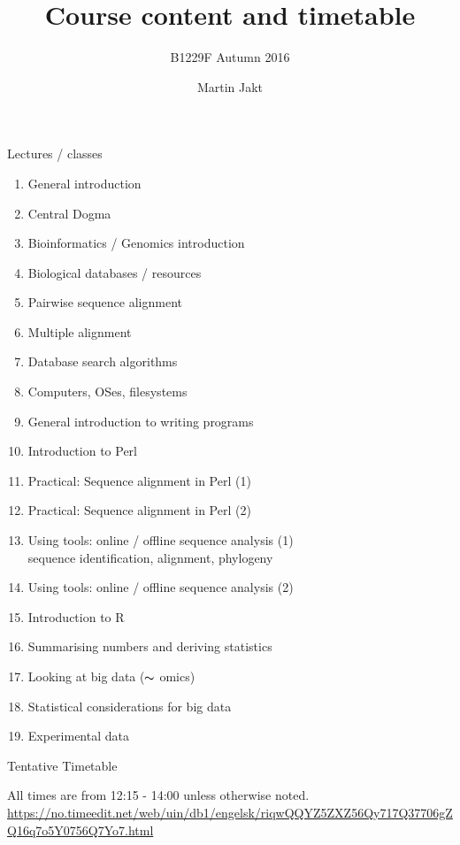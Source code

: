 \documentclass[pdf]{beamer}
\title{Course content and timetable}
\subtitle{B1229F Autumn 2016}
\author{Martin Jakt}
\begin{document}
\begin{frame}{Lectures / classes}
  \tiny
  \begin{enumerate}
  \item General introduction
  \item Central Dogma
  \item Bioinformatics / Genomics introduction
  \item Biological databases / resources
  \item Pairwise sequence alignment
  \item Multiple alignment
  \item Database search algorithms
  \item Computers, OSes, filesystems
  \item General introduction to writing programs
  \item Introduction to Perl
  \item Practical: Sequence alignment in Perl (1)
  \item Practical: Sequence alignment in Perl (2)
  \item Using tools: online / offline sequence analysis (1) \\
    sequence identification, alignment, phylogeny
  \item Using tools: online / offline sequence analysis (2)
  \item Introduction to R
  \item Summarising numbers and deriving statistics
  \item Looking at big data ($\thicksim$ omics)
  \item Statistical considerations for big data
  \item Experimental data
  \end{enumerate}

\end{frame}

\begin{frame}{Tentative Timetable}
\vspace*{-0.4cm}                        
\begin{figure}[ht]
  \tiny
  
  \end{figure}
  \vspace*{+0.03cm}
  {\tiny
  All times are from 12:15 - 14:00 unless otherwise noted.
  \url{https://no.timeedit.net/web/uin/db1/engelsk/riqwQQYZ5ZXZ56Qy717Q37706gZQ16q7o5Y0756Q7Yo7.html}
  }
  
\end{frame}
\end{document}
